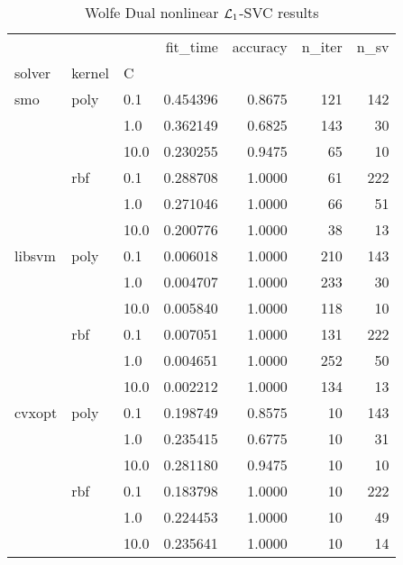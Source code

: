 \begin{table}[H]
\centering
\caption{Wolfe Dual nonlinear $\protect \mathcal{L}_1$-SVC results}
\label{nonlinear_dual_l1_svc_cv_results}
\begin{tabular}{lllrrrr}
\toprule
       &     &      &  fit\_time &  accuracy &  n\_iter &  n\_sv \\
solver & kernel & C &           &           &         &       \\
\midrule
smo & poly & 0.1  &  0.454396 &    0.8675 &     121 &   142 \\
       &     & 1.0  &  0.362149 &    0.6825 &     143 &    30 \\
       &     & 10.0 &  0.230255 &    0.9475 &      65 &    10 \\
       & rbf & 0.1  &  0.288708 &    1.0000 &      61 &   222 \\
       &     & 1.0  &  0.271046 &    1.0000 &      66 &    51 \\
       &     & 10.0 &  0.200776 &    1.0000 &      38 &    13 \\
libsvm & poly & 0.1  &  0.006018 &    1.0000 &     210 &   143 \\
       &     & 1.0  &  0.004707 &    1.0000 &     233 &    30 \\
       &     & 10.0 &  0.005840 &    1.0000 &     118 &    10 \\
       & rbf & 0.1  &  0.007051 &    1.0000 &     131 &   222 \\
       &     & 1.0  &  0.004651 &    1.0000 &     252 &    50 \\
       &     & 10.0 &  0.002212 &    1.0000 &     134 &    13 \\
cvxopt & poly & 0.1  &  0.198749 &    0.8575 &      10 &   143 \\
       &     & 1.0  &  0.235415 &    0.6775 &      10 &    31 \\
       &     & 10.0 &  0.281180 &    0.9475 &      10 &    10 \\
       & rbf & 0.1  &  0.183798 &    1.0000 &      10 &   222 \\
       &     & 1.0  &  0.224453 &    1.0000 &      10 &    49 \\
       &     & 10.0 &  0.235641 &    1.0000 &      10 &    14 \\
\bottomrule
\end{tabular}
\end{table}
